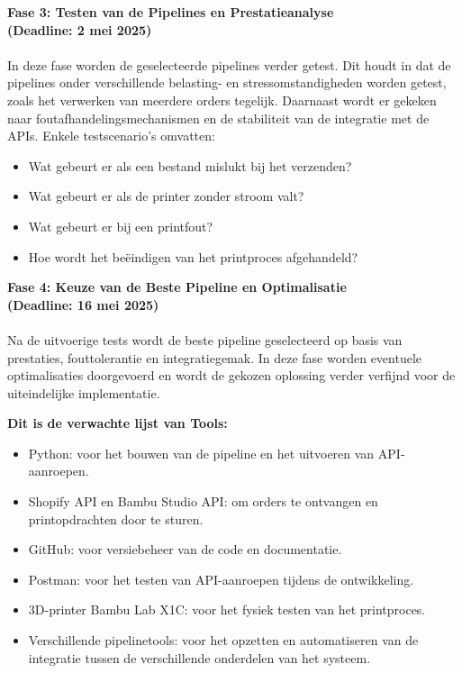 \textbf{Fase 3: Testen van de Pipelines en Prestatieanalyse}\\
\textbf{(Deadline: 2 mei 2025)}\\\\
In deze fase worden de geselecteerde pipelines verder getest. Dit houdt in dat de pipelines onder verschillende belasting- en stressomstandigheden worden getest, zoals het verwerken van meerdere orders tegelijk. Daarnaast wordt er gekeken naar foutafhandelingsmechanismen en de stabiliteit van de integratie met de APIs. Enkele testscenario's omvatten: 
\begin{itemize}
     \item Wat gebeurt er als een bestand mislukt bij het verzenden?
      \item Wat gebeurt er als de printer zonder stroom valt?
       \item Wat gebeurt er bij een printfout?
        \item Hoe wordt het beëindigen van het printproces afgehandeld? 
\end{itemize}
\vspace{1em}

\textbf{Fase 4: Keuze van de Beste Pipeline en Optimalisatie}\\
\textbf{(Deadline: 16 mei 2025)}\\\\
Na de uitvoerige tests wordt de beste pipeline geselecteerd op basis van prestaties, fouttolerantie en integratiegemak. In deze fase worden eventuele optimalisaties doorgevoerd en wordt de gekozen oplossing verder verfijnd voor de uiteindelijke implementatie.

\vspace{1em}
\textbf{Dit is de verwachte lijst van Tools:}\\
\begin{itemize}
\item Python: voor het bouwen van de pipeline en het uitvoeren van API-aanroepen.
\item Shopify API en Bambu Studio API: om orders te ontvangen en printopdrachten door te sturen.
\item GitHub: voor versiebeheer van de code en documentatie.
\item Postman: voor het testen van API-aanroepen tijdens de ontwikkeling.
\item 3D-printer Bambu Lab X1C: voor het fysiek testen van het printproces.
\item Verschillende pipelinetools: voor het opzetten en automatiseren van de integratie tussen de verschillende onderdelen van het systeem.
\end{itemize}

